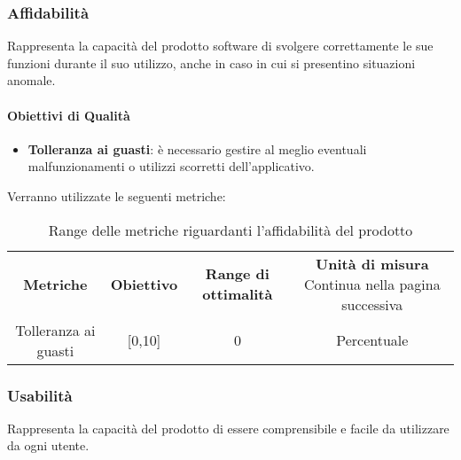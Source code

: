         \subsubsection{Affidabilità}
        Rappresenta la capacità del prodotto software di svolgere correttamente le sue funzioni durante il suo utilizzo, anche in caso in cui si presentino situazioni anomale.
        \paragraph{Obiettivi di Qualità}
        \begin{itemize}
            \item \textbf{Tolleranza ai guasti}:  è necessario gestire al meglio eventuali malfunzionamenti o utilizzi scorretti dell'applicativo.
        \end{itemize}
        Verranno utilizzate le seguenti metriche:
        \begin{center}
            \renewcommand{\arraystretch}{2.2}
            
            \begin{longtable}{c c c c }
              
              \rowcolor[HTML]{232f3e}
            
              \rowcolors{1}{tableRow}{}
              \color[HTML]{FFFFFF} \textbf{Metriche} & \color[HTML]{FFFFFF} \centering\textbf{Obiettivo} & \color[HTML]{FFFFFF} \centering\textbf{Range di ottimalità} & \color[HTML]{FFFFFF} \centering\textbf{Unità di misura} 
            \endhead
            \rowcolor{white}\multicolumn{1}{c}
               { Continua nella pagina successiva} \\
               \endfoot
               \caption [Range delle metriche riguardanti l'affidabilità del prodotto]{Range delle metriche riguardanti l'affidabilità del prodotto}
              \label{tabella:reqP1}
               \endlastfoot
               Tolleranza ai guasti & [0,10] & 0 & Percentuale \\

            \end{longtable}

        \end{center}
       
        \subsubsection{Usabilità}
        Rappresenta la capacità del prodotto di essere comprensibile e facile da utilizzare 
        da ogni utente.
